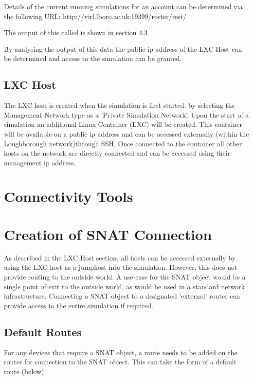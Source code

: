 \documentclass[11pt]{report}
\begin{document}
Details of the current running simulations for an account can be determined via the following URL: http://virl.lboro.ac.uk:19399/roster/rest/

The output of this called is shown in section 4.3

By analysing the output of this data the public ip address of the LXC Host can be determined and access to the simulation can be granted.

\subsection*{LXC Host}

The LXC host is created when the simulation is first started, by selecting the Management Network type as a 'Private Simulation Network'. Upon the start of a simulation an additional Linux Container (LXC) will be created. This container will be available on a public ip address and can be accessed externally (within the Loughborough network)through SSH. Once connected to the container all other hosts on the network are directly connected and can be accessed using their management ip address.

\section*{Connectivity Tools}

\section*{Creation of SNAT Connection}

As described in the LXC Host section, all hosts can be accessed externally by using the LXC host as a jumphost into the simulation. However, this does not provide routing to the outside world. A use-case for the SNAT object would be a single point of exit to the outside world, as would be used in a standard network infrastructure. Connecting a SNAT object to a designated 'external' router can provide access to the entire simulation if required.

\subsection*{Default Routes}

For any devices that require a SNAT object, a route needs to be added on the router for connection to the SNAT object. This can take the form of a default route (below)
\end{document}
